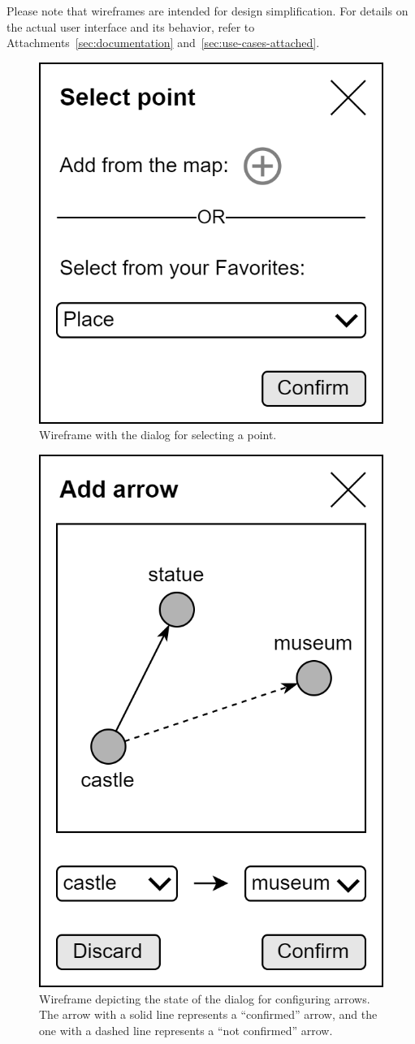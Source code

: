 Please note that wireframes are intended for design simplification. For details on the actual user interface and its behavior, refer to Attachments~\ref{sec:documentation} and~\ref{sec:use-cases-attached}.

\clearpage

\begin{figure}
\centering
\includegraphics[width=0.45\linewidth]{img/design/ui-dialog-select-point.png}
\caption{Wireframe with the dialog for selecting a point.}
\label{fig:ui-dialog-select-point}
\end{figure}

\begin{figure}
\centering
\includegraphics[width=0.45\linewidth]{img/design/ui-dialog-add-arrow.png}
\caption{Wireframe depicting the state of the dialog for con\-fig\-ur\-ing arrows. The arrow with a solid line represents a ``confirmed'' arrow, and the one with a dashed line represents a ``not confirmed'' arrow.}
\label{fig:ui-dialog-add-arrow}
\end{figure}

\clearpage


